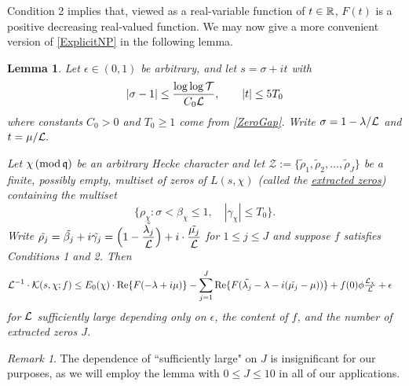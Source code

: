 \documentclass[12pt,psamsfonts]{amsart}
\newtheorem{lem}[thm]{Lemma}
\theoremstyle{definition}
\theoremstyle{remark}
\newtheorem*{rem*}{Remark}
\numberwithin{equation}{section}
\begin{document}
\vspace{-4mm} 
\noindent
Condition 2 implies that, viewed as a real-variable function of $t \in \mathbb{R}$, $F(t)$ is a positive decreasing real-valued function. We may now give a more convenient version of \cref{ExplicitNP} in the following lemma. 
\begin{lem} \label{ExplicitNP-Apply} Let $\epsilon \in (0,1)$ be arbitrary, and let $s = \sigma + it$ with
\[
|\sigma-1| \leq \frac{\log\log \mathcal{T}}{C_0 \mathcal{L}}, \qquad |t| \leq 5T_0
\]
where constants $C_0 > 0$ and $T_0 \geq 1$ come from \cref{ZeroGap}. Write $\sigma = 1 -  \lambda/\mathcal{L}$ and $t = \mu/\mathcal{L}.$ 

Let $\chi \, (\mathrm{mod} {\, \mathfrak{q}})$ be an arbitrary Hecke character and let $\mathcal{Z} := \{ \tilde{\rho}_1, \tilde{\rho}_2, \dots, \tilde{\rho}_J\}$
 be a finite, possibly empty, multiset of zeros of $L(s,\chi)$ (called the \underline{extracted zeros}) containing the multiset
 \[
 \{ \rho_{\chi} :  \sigma < \beta_{\chi} \leq 1, \quad |\gamma_{\chi}| \leq T_0 \}. 
 \]
 Write $\tilde{\rho_j} = \tilde{\beta_j} + i\tilde{\gamma_j} =  \Big(1-\dfrac{\tilde{\lambda_j}}{\mathcal{L}}\Big) + i\cdot \dfrac{\tilde{\mu_j}}{\mathcal{L}}$ for $1 \leq j \leq J$ and suppose $f$ satisfies Conditions 1 and 2. Then
 \begin{equation*}
\begin{aligned}
\mathcal{L}^{-1} \cdot \mathcal{K}(s,\chi; f) & \leq E_0(\chi) \cdot \mathrm{Re}\{  F(-\lambda + i\mu) \} - \sum_{j=1}^J \mathrm{Re}\{ F(\tilde{\lambda_j}-\lambda - i(\tilde{\mu_j}-\mu) ) \}   + f(0) \phi \tfrac{\mathcal{L}_{\chi}}{\mathcal{L}}   + \epsilon
\end{aligned}
\end{equation*}
for $\mathcal{L}$ sufficiently large depending only on $\epsilon$, the content of $f$, and the number of extracted zeros $J$. 
\end{lem}
\begin{rem*} The dependence of ``sufficiently large" on $J$ is insignificant for our purposes, as we will employ the lemma with $0 \leq J \leq 10$ in all of our applications.
\end{rem*}
\end{document}
